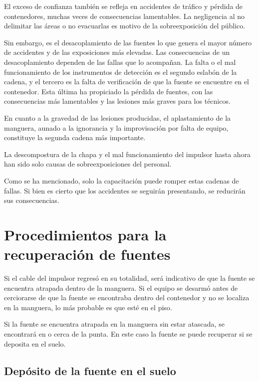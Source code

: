 El exceso de confianza también se refleja en accidentes de tráfico y pérdida de contenedores, muchas veces de consecuencias lamentables. La negligencia al no delimitar las áreas o no evacuarlas es motivo de la sobreexposición del público.

Sin embargo, es el desacoplamiento de las fuentes lo que genera el mayor número de accidentes y de las exposiciones más elevadas. Las consecuencias de un desacoplamiento dependen de las fallas que lo acompañan. La falta o el mal funcionamiento de los instrumentos de detección es el segundo eslabón de la cadena, y el tercero es la falta de verificación de que la fuente se encuentre en el contenedor. Esta última ha propiciado la pérdida de fuentes, con las consecuencias más lamentables y las lesiones más graves para los técnicos.

En cuanto a la gravedad de las lesiones producidas, el aplastamiento de la manguera, aunado a la ignorancia y la improvisación por falta de equipo, constituye la segunda cadena más importante.

La descompostura de la chapa y el mal funcionamiento del impulsor hasta ahora han sido solo causas de sobreexposiciones del personal.

Como se ha mencionado, solo la capacitación puede romper estas cadenas de fallas. Si bien es cierto que los accidentes se seguirán presentando, se reducirán sus consecuencias.

\section{Procedimientos para la recuperación de fuentes}

Si el cable del impulsor regresó en su totalidad, será indicativo de que la fuente se encuentra atrapada dentro de la manguera. Si el equipo se desarmó antes de cerciorarse de que la fuente se encontraba dentro del contenedor y no se localiza en la manguera, lo más probable es que esté en el piso.

Si la fuente se encuentra atrapada en la manguera sin estar atascada, se encontrará en o cerca de la punta. En este caso la fuente se puede recuperar si se deposita en el suelo.

\subsection{Depósito de la fuente en el suelo}

